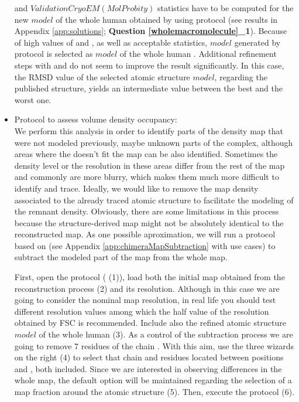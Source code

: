 \begin{itemize}
 \emringer and $Validation CryoEM (MolProbity)$ statistics have to be computed for the new $model$ of the whole human  obtained by using \chimera {} protocol (see results  in Appendix \ref{app:solutions}; \textbf{Question \ref{wholemacromolecule}\_1}). Because of high values of \ccmask and \emringer {}, as well as acceptable \molprobity statistics, $model$ generated by \chimera {} protocol is selected as $model$ of the whole human . Additional refinement steps with \phenix {} and  do not seem to improve the result significantly. In this case, the RMSD value of the selected atomic structure $model$, regarding the published structure, yields an intermediate value between the best and the worst one.\\
 
 \item Protocol  to assess volume density occupancy:\\
 
 We perform this analysis in order to identify parts of the density map that were not modeled previously, maybe unknown parts of the complex, although areas where the  doesn't fit the map can be also identified. Sometimes the density level or the resolution in these areas differ from the rest of the map and commonly are more blurry, which makes them much more difficult to identify and trace. Ideally, we would like to remove the map density associated to the already traced atomic structure to facilitate the modeling of the remnant density. Obviously, there are some limitations in this process because the structure-derived map might not be absolutely identical to the reconstructed map. As one possible aproximation, we will run a protocol based on \chimera (see Appendix \ref{app:chimeraMapSubtraction} with use cases) to subtract the modeled part of the map from the whole map.
 
 First, open the \chimera {} protocol ( (1)), load both the initial map obtained from the reconstruction process (2) and its resolution. Although in this case we are going to consider the nominal map resolution, in real life you should test different resolution values among which the half value of the resolution obtained by FSC is recommended. Include also the refined atomic structure $model$ of the whole human  (3). As a control of the subtraction process we are going to remove 7 residues of the chain . With this aim, use the three wizards on the right (4) to select that chain and residues located between positions  and , both included. Since we are interested in observing differences in the whole map, the default option  will be maintained regarding the selection of a map fraction around the atomic structure (5). Then, execute the protocol (6). 
 

\end{itemize}
